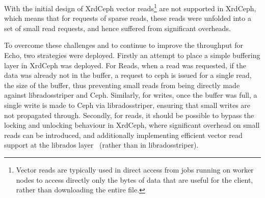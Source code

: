 \documentclass{webofc}
\begin{document}
With the initial design of XrdCeph vector reads\footnote{Vector reads are typically used in direct access from jobs running on worker nodes to access directly only the bytes of data that are useful for the client, rather than downloading the entire file.} are not supported in XrdCeph, which means that for requests of sparse reads, these reads were unfolded into a set of small read requests, and hence suffered from significant overheads.

To overcome these challenges and to continue to improve the throughput for Echo, two strategies were deployed. Firstly an attempt to place a simple buffering layer in XrdCeph was deployed. For Reads, when a read was requested, if the data was already not in the buffer, a request to ceph is issued for a single read, the size of the buffer, thus preventing small reads from being directly made against libradosstriper and Ceph. Similarly, for writes, once the buffer was full, a single write is made to Ceph via libradosstriper, ensuring that small writes are not propagated through. 
Secondly, for reads, it should be possible to bypass the locking and unlocking behaviour in XrdCeph, where significant overhead on small reads can be introduced, and additionally implementing efficient vector read support at the librados layer~\cite{tomceph23} (rather than in libradosstriper).
\end{document}
